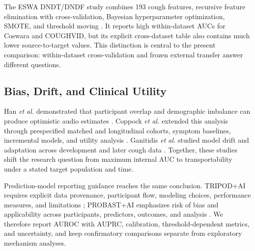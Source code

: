 The ESWA DNDT/DNDF study combines 193 cough features, recursive feature
elimination with cross-validation, Bayesian hyperparameter optimization,
SMOTE, and threshold moving \cite{islam2026robust}. It reports high
within-dataset AUCs for Coswara and COUGHVID, but its explicit cross-dataset
table also contains much lower source-to-target values. This distinction is
central to the present comparison: within-dataset cross-validation and frozen
external transfer answer different questions.

\subsection{Bias, Drift, and Clinical Utility}

Han \emph{et al.} demonstrated that participant overlap and demographic
imbalance can produce optimistic audio estimates \cite{han2022realistic}.
Coppock \emph{et al.} extended this analysis through prespecified matched and
longitudinal cohorts, symptom baselines, incremental models, and utility
analysis \cite{coppock2024audio}. Ganitidis \emph{et al.} studied model drift
and adaptation across development and later cough data \cite{ganitidis2025drift}.
Together, these studies shift the research question from maximum internal AUC
to transportability under a stated target population and time.

Prediction-model reporting guidance reaches the same conclusion. TRIPOD+AI
requires explicit data provenance, participant flow, modeling choices,
performance measures, and limitations \cite{collins2024tripod}; PROBAST+AI
emphasizes risk of bias and applicability across participants, predictors,
outcomes, and analysis \cite{moons2025probast}. We therefore report AUROC with
AUPRC, calibration, threshold-dependent metrics, and uncertainty, and keep
confirmatory comparisons separate from exploratory mechanism analyses.
